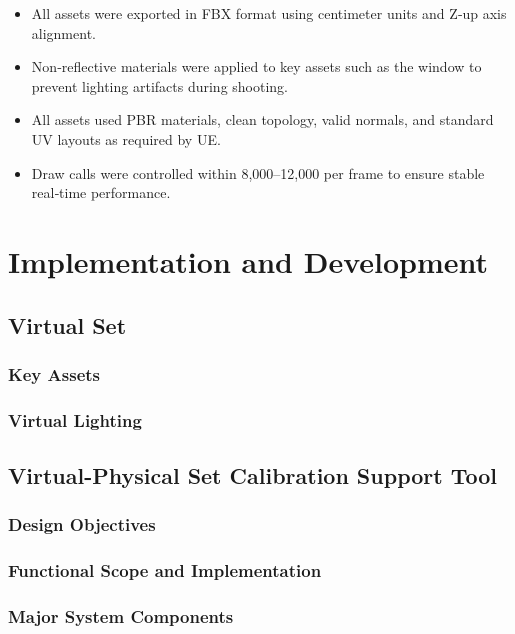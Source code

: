 \documentclass[12pt,a4paper]{report}
\begin{document}
\begin{itemize}
\item All assets were exported in FBX format using centimeter units and Z‑up axis alignment.
\item Non‑reflective materials were applied to key assets such as the window to prevent lighting artifacts during shooting.
\item All assets used PBR materials, clean topology, valid normals, and standard UV layouts as required by UE.
\item Draw calls were controlled within 8,000–12,000 per frame to ensure stable real‑time performance.
\end{itemize}


\chapter{Implementation and Development}

\section{Virtual Set}

\subsection{Key Assets}

\subsection{Virtual Lighting}

\section{Virtual-Physical Set Calibration Support Tool}

\subsection{Design Objectives}

\subsection{Functional Scope and Implementation}

\subsection{Major System Components}
\end{document}
